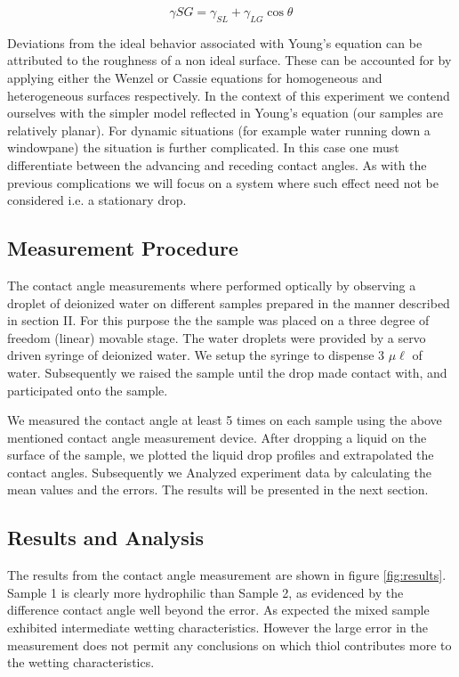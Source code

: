 \begin{equation}
\gamma{SG} = \gamma_{SL} + \gamma_{LG} \cos{\theta}
\end{equation}

Deviations from the ideal behavior associated with Young's equation can be attributed to the roughness of a non ideal surface. These can be accounted for by applying either the Wenzel or Cassie equations for homogeneous and heterogeneous surfaces respectively. In the context of this experiment we contend ourselves with the simpler model reflected in Young's equation (our samples are relatively planar).
For dynamic situations (for example water running down a windowpane) the situation is further complicated. In this case one must differentiate between the advancing and receding contact angles. As with the previous complications we will focus on a system where such effect need not be considered i.e. a stationary drop.

\subsection{Measurement Procedure}

The contact angle measurements where performed optically by observing a droplet of deionized water on different samples prepared in the manner described in section II. For this purpose the the sample was placed on a three degree of freedom (linear) movable stage. The water droplets were provided by a servo driven syringe of deionized water. We setup the syringe to dispense 3 $\mu \ell$ of water. Subsequently we raised the sample until the drop made contact with, and participated onto the sample. 

We measured the contact angle at least 5 times on each sample using the above mentioned contact angle measurement device. After dropping a liquid on the surface of the sample, we plotted the liquid drop profiles and extrapolated the contact angles. Subsequently we Analyzed experiment data by calculating the mean values and the errors. The results will be presented in the next section.

\subsection{Results and Analysis}

The results from the contact angle measurement are shown in figure \ref{fig:results}. Sample 1 is clearly more hydrophilic than Sample 2, as evidenced by the difference contact angle well beyond the error. As expected the mixed sample exhibited intermediate wetting characteristics. However the large error in the measurement does not permit any conclusions on which thiol contributes more to the wetting characteristics.

